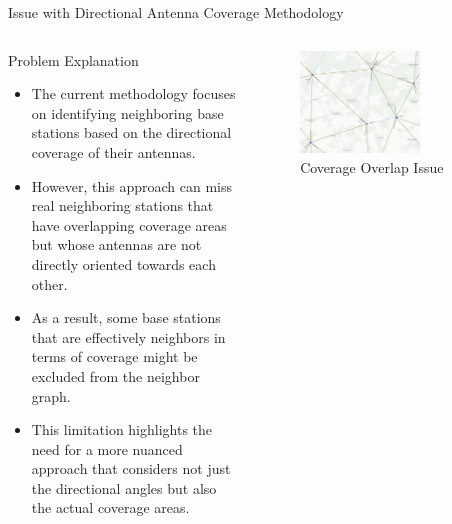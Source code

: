 \begin{frame}{Issue with Directional Antenna Coverage Methodology}
    \begin{columns}
        \begin{column}{0.5\textwidth}
            \begin{block}{Problem Explanation}
                \begin{itemize}
                    \item The current methodology focuses on identifying neighboring base stations based on the directional coverage of their antennas.
                    \item However, this approach can miss real neighboring stations that have overlapping coverage areas but whose antennas are not directly oriented towards each other.
                    \item As a result, some base stations that are effectively neighbors in terms of coverage might be excluded from the neighbor graph.
                    \item This limitation highlights the need for a more nuanced approach that considers not just the directional angles but also the actual coverage areas.
                \end{itemize}
            \end{block}
        \end{column}
        \begin{column}{0.5\textwidth}
            \begin{figure}
                \includegraphics[width=0.7\textwidth]{images/Altair/problem_with_azimuth.png}  
                \caption{Coverage Overlap Issue}
            \end{figure}
        \end{column}
    \end{columns}
\end{frame}







